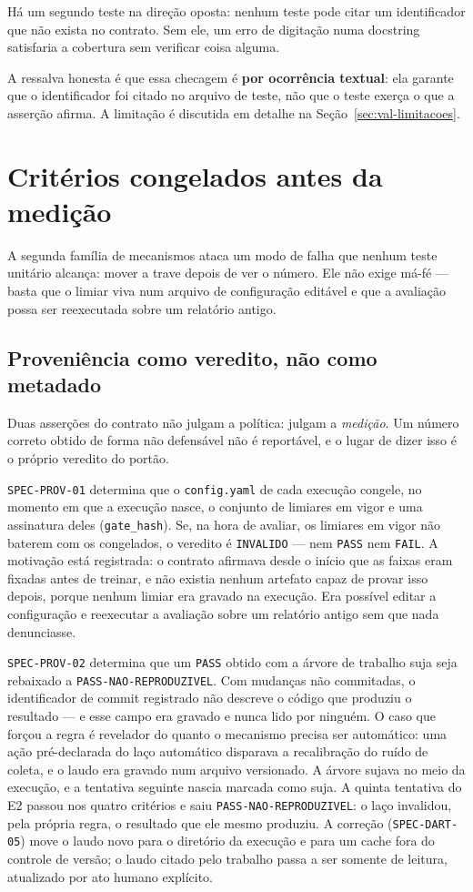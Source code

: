 Há um segundo teste na direção oposta: nenhum teste pode citar um identificador
que não exista no contrato. Sem ele, um erro de digitação numa docstring
satisfaria a cobertura sem verificar coisa alguma.

A ressalva honesta é que essa checagem é \textbf{por ocorrência textual}: ela
garante que o identificador foi citado no arquivo de teste, não que o teste
exerça o que a asserção afirma. A limitação é discutida em detalhe na
Seção~\ref{sec:val-limitacoes}.

\section{Critérios congelados antes da medição}\label{sec:val-congelado}

A segunda família de mecanismos ataca um modo de falha que nenhum teste unitário
alcança: mover a trave depois de ver o número. Ele não exige má-fé --- basta que
o limiar viva num arquivo de configuração editável e que a avaliação possa ser
reexecutada sobre um relatório antigo.

\subsection{Proveniência como veredito, não como metadado}

Duas asserções do contrato não julgam a política: julgam a \textit{medição}. Um
número correto obtido de forma não defensável não é reportável, e o lugar de
dizer isso é o próprio veredito do portão.

\texttt{SPEC-PROV-01} determina que o \texttt{config.yaml} de cada execução
congele, no momento em que a execução nasce, o conjunto de limiares em vigor e
uma assinatura deles (\texttt{gate\_hash}). Se, na hora de avaliar, os limiares
em vigor não baterem com os congelados, o veredito é \texttt{INVALIDO} --- nem
\texttt{PASS} nem \texttt{FAIL}. A motivação está registrada: o contrato afirmava
desde o início que as faixas eram fixadas antes de treinar, e não existia nenhum
artefato capaz de provar isso depois, porque nenhum limiar era gravado na
execução. Era possível editar a configuração e reexecutar a avaliação sobre um
relatório antigo sem que nada denunciasse.

\texttt{SPEC-PROV-02} determina que um \texttt{PASS} obtido com a árvore de
trabalho suja seja rebaixado a \texttt{PASS-NAO-REPRODUZIVEL}. Com mudanças não
commitadas, o identificador de commit registrado não descreve o código que
produziu o resultado --- e esse campo era gravado e nunca lido por ninguém. O
caso que forçou a regra é revelador do quanto o mecanismo precisa ser
automático: uma ação pré-declarada do laço automático disparava a recalibração do
ruído de coleta, e o laudo era gravado num arquivo versionado. A árvore sujava no
meio da execução, e a tentativa seguinte nascia marcada como suja. A quinta
tentativa do E2 passou nos quatro critérios e saiu
\texttt{PASS-NAO-REPRODUZIVEL}: o laço invalidou, pela própria regra, o resultado
que ele mesmo produziu. A correção (\texttt{SPEC-DART-05}) move o laudo novo para
o diretório da execução e para um cache fora do controle de versão; o laudo
citado pelo trabalho passa a ser somente de leitura, atualizado por ato humano
explícito.

